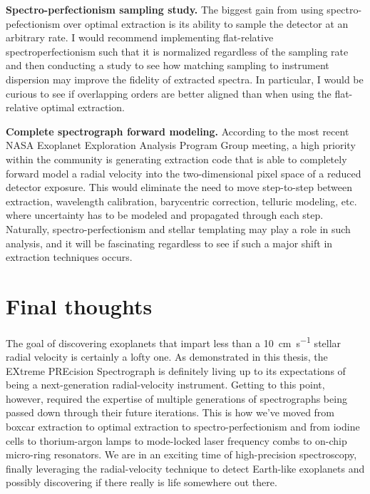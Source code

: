 \textbf{Spectro-perfectionism sampling study.} The biggest gain from using spectro-pefectionism over optimal extraction is its ability to sample the detector at an arbitrary rate. I would recommend implementing flat-relative spectroperfectionism such that it is normalized regardless of the sampling rate and then conducting a study to see how matching sampling to instrument dispersion may improve the fidelity of extracted spectra. In particular, I would be curious to see if overlapping orders are better aligned than when using the flat-relative optimal extraction.

\textbf{Complete spectrograph forward modeling.} According to the most recent NASA Exoplanet Exploration Analysis Program Group meeting, a high priority within the community is generating extraction code that is able to completely forward model a radial velocity into the two-dimensional pixel space of a reduced detector exposure. This would eliminate the need to move step-to-step between extraction, wavelength calibration, barycentric correction, telluric modeling, etc. where uncertainty has to be modeled and propagated through each step. Naturally, spectro-perfectionism and stellar templating may play a role in such analysis, and it will be fascinating regardless to see if such a major shift in extraction techniques occurs.

\section{Final thoughts} \label{conclusion:final}

The goal of discovering exoplanets that impart less than a 10~\si{\centi\meter\per\second} stellar radial velocity is certainly a lofty one. As demonstrated in this thesis, the EXtreme PREcision Spectrograph is definitely living up to its expectations of being a next-generation radial-velocity instrument. Getting to this point, however, required the expertise of multiple generations of spectrographs being passed down through their future iterations. This is how we've moved from boxcar extraction to optimal extraction to spectro-perfectionism and from iodine cells to thorium-argon lamps to mode-locked laser frequency combs to on-chip micro-ring resonators. We are in an exciting time of high-precision spectroscopy, finally leveraging the radial-velocity technique to detect Earth-like exoplanets and possibly discovering if there really is life somewhere out there.